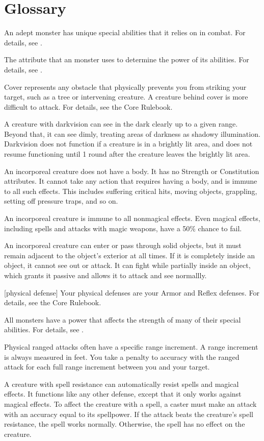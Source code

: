 \chapter{Glossary}\label{Glossary}

 An adept monster has unique special abilities that it relies on in combat.
For details, see .

 The attribute that an  monster uses to determine the power of its abilities.
For details, see .

 Cover represents any obstacle that physically prevents you from striking your target, such as a tree or intervening creature. A creature behind cover is more difficult to attack.
For details, see the Core Rulebook.

 A creature with darkvision can see in the dark clearly up to a given range.
Beyond that, it can see dimly, treating areas of darkness as shadowy illumination.
Darkvision does not function if a creature is in a brightly lit area, and does not resume functioning until 1 round after the creature leaves the brightly lit area.

 An incorporeal creature does not have a body.
It has no Strength or Constitution attributes.
It cannot take any action that requires having a body, and is immune to all such effects.
This includes suffering critical hits, moving objects, grappling, setting off pressure traps, and so on.

An incorporeal creature is immune to all nonmagical effects.
Even magical effects, including spells and attacks with magic weapons, have a 50\% chance to fail.

An incorporeal creature can enter or pass through solid objects, but it must remain adjacent to the object's exterior at all times.
If it is completely inside an object, it cannot see out or attack.
It can fight while partially inside an object, which grants it passive  and allows it to attack and see normallly.

[physical defense] Your physical defenses are your Armor and Reflex defenses.
For details, see the Core Rulebook.

 All monsters have a power that affects the strength of many of their special abilities.
For details, see .

 Physical ranged attacks often have a specific range increment.
A range increment is always measured in feet.
You take a  penalty to accuracy with the ranged attack for each full range increment between you and your target.

 A creature with spell resistance can automatically resist spells and magical effects.
It functions like any other defense, except that it only works against magical effects.
To affect the creature with a spell, a caster must make an attack with an accuracy equal to its spellpower.
If the attack beats the creature's spell resistance, the spell works normally.
Otherwise, the spell has no effect on the creature.
